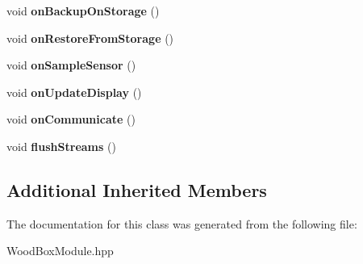 \begin{DoxyCompactItemize}
\mbox{\label{classwood_box_1_1module_1_1_wood_box_module_a28c9b89bc3429d6e78fa38698c78d553}} 
void {\bfseries on\+Backup\+On\+Storage} ()
\item 
\mbox{\label{classwood_box_1_1module_1_1_wood_box_module_a89395caa73cadc63c576931b45400c2d}} 
void {\bfseries on\+Restore\+From\+Storage} ()
\item 
\mbox{\label{classwood_box_1_1module_1_1_wood_box_module_a227e8b23e8435f622f4d59eb6847e98b}} 
void {\bfseries on\+Sample\+Sensor} ()
\item 
\mbox{\label{classwood_box_1_1module_1_1_wood_box_module_a1461bd1a53529065541c87fc03a28f57}} 
void {\bfseries on\+Update\+Display} ()
\item 
\mbox{\label{classwood_box_1_1module_1_1_wood_box_module_acacb4ac748c70bd1f172d9a87e07dfbf}} 
void {\bfseries on\+Communicate} ()
\item 
\mbox{\label{classwood_box_1_1module_1_1_wood_box_module_a240ad6ff3f905a531fcc62670a26a6fa}} 
void {\bfseries flush\+Streams} ()
\end{DoxyCompactItemize}
\subsection*{Additional Inherited Members}


The documentation for this class was generated from the following file\+:\begin{DoxyCompactItemize}
\item 
Wood\+Box\+Module.\+hpp\end{DoxyCompactItemize}
